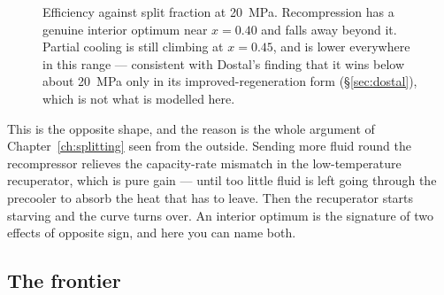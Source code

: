 \documentclass[11pt,a4paper]{report}
\begin{document}
\begin{figure}[htbp]
\centering
{}
\caption{Efficiency against split fraction at \SI{20}{\mega\pascal}.
Recompression has a genuine interior optimum near $x = 0.40$ and falls away
beyond it. Partial cooling is still climbing at $x = 0.45$, and is lower
everywhere in this range --- consistent with Dostal's finding that it wins
below about \SI{20}{\mega\pascal} only in its improved-regeneration form
(\S\ref{sec:dostal}), which is not what is modelled here.}
\label{fig:eta_x}
\end{figure}

This is the opposite shape, and the reason is the whole argument of
Chapter~\ref{ch:splitting} seen from the outside. Sending more fluid round
the recompressor relieves the capacity-rate mismatch in the low-temperature
recuperator, which is pure gain --- until too little fluid is left going
through the precooler to absorb the heat that has to leave. Then the
recuperator starts starving and the curve turns over. An interior optimum is
the signature of two effects of opposite sign, and here you can name both.

\subsection{The frontier}
\end{document}
